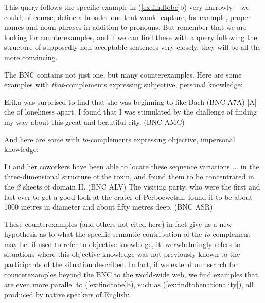 This query follows the specific example in (\ref{ex:findtobe}b) very narrowly -- we could, of course, define a broader one that would capture,  for example, proper names and noun  phrases in addition to pronouns.  But remember that we are looking for counterexamples,  and if we can find these with a query following the structure of supposedly non\hyp{}acceptable  sentences very closely, they will be all the more convincing.

The BNC  contains not just one, but many counterexamples.  Here are some examples with \textit{that}-complements  expressing subjective, personal knowledge:

\begin{exe}
\ex
\begin{xlist}
\label{ex:findthatsubjective}
\ex Erika was surprised to find that she was beginning to like Bach (BNC A7A)
\ex $[$A$]$che of loneliness apart, I found that I was stimulated by the challenge of finding my way about this great and beautiful city. (BNC AMC)
\end{xlist}
\end{exe}

And here are some with \textit{to}-complements  expressing objective, impersonal knowledge:

\begin{exe}
\ex
\begin{xlist}
\label{ex:findtobefact}
\ex Li and her coworkers have been able to locate these sequence variations ... in the three\hyp{}dimensional structure of the toxin, and found them to be concentrated in the $\beta$ sheets of domain II. (BNC ALV)
\ex The visiting party, who were the first and last ever to get a good look at the crater of Perboewetan, found it to be about \num{1000} metres in diameter and about fifty metres deep. (BNC ASR)
\end{xlist}
\end{exe}

These counterexamples  (and others not cited here) in fact give us a new hypothesis as to what the specific semantic  contribution of the \textit{to}-complement  may be: if used to refer to objective knowledge, it overwhelmingly refers to situations where this objective knowledge was not previously known to the participants of the situation described. In fact, if we extend our search for counterexamples  beyond the BNC  to the world\hyp{}wide web, we find examples that are even more parallel to (\ref{ex:findtobe}b), such as (\ref{ex:findtobenationality}), all produced by native speakers of English:

